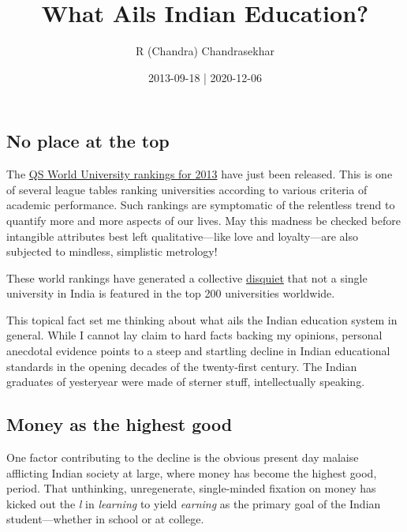 \documentclass[
  12pt,
  british,
  a4paper,
  rgb,
  dvipsnames,
  svgnames,
  hyphens]{article}
\title{What Ails Indian Education?}
\author{R (Chandra) Chandrasekhar}
\date{2013-09-18 | 2020-12-06}
\begin{document}
\maketitle

\setlength{\parindent}{0pt} %
\thispagestyle{empty}


\hypertarget{no-place-at-the-top}{%
\subsection{No place at the top}\label{no-place-at-the-top}}

The
\href{http://www.topuniversities.com/university-rankings/world-university-rankings/2013\#sorting=rank+region=+country=+faculty=+stars=false+search=}{QS
World University rankings for 2013} have just been released. This is one
of several league tables ranking universities according to various
criteria of academic performance. Such rankings are symptomatic of the
relentless trend to quantify more and more aspects of our lives. May
this madness be checked before intangible attributes best left
qualitative---like love and loyalty---are also subjected to mindless,
simplistic metrology!

These world rankings have generated a collective
\href{http://articles.timesofindia.indiatimes.com/2013-09-11/news/41969629_1_qs-world-university-rankings-mumbai-university-indian}{disquiet}
that not a single university in India is featured in the top 200
universities worldwide.

This topical fact set me thinking about what ails the Indian education
system in general. While I cannot lay claim to hard facts backing my
opinions, personal anecdotal evidence points to a steep and startling
decline in Indian educational standards in the opening decades of the
twenty-first century. The Indian graduates of yesteryear were made of
sterner stuff, intellectually speaking.

\hypertarget{money-as-the-highest-good}{%
\subsection{Money as the highest good}\label{money-as-the-highest-good}}

One factor contributing to the decline is the obvious present day
malaise afflicting Indian society at large, where money has become the
highest good, period. That unthinking, unregenerate, single-minded
fixation on money has kicked out the \emph{l} in \emph{learning} to
yield \emph{earning} as the primary goal of the Indian student---whether
in school or at college.
\end{document}
